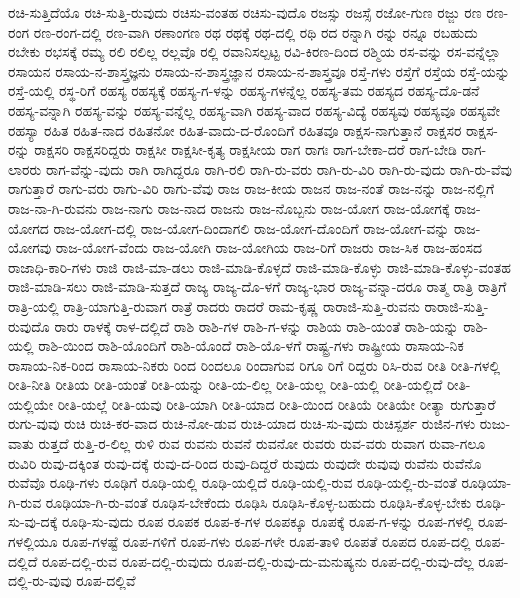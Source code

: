 {ರಚಿ-ಸುತ್ತಿದೆಯೊ
ರಚಿ-ಸುತ್ತಿ-ರುವುದು
ರಚಿಸು-ವಂತಹ
ರಚಿಸು-ವುದೊ
ರಜಸ್ಸು
ರಜಸ್ಸೆ
ರಜೋ-ಗುಣ
ರಜ್ಜು
ರಣ
ರಣ-ರಂಗ
ರಣ-ರಂಗ-ದಲ್ಲಿ
ರಣ-ವಾಗಿ
ರಣಾಂಗಣ
ರಥ
ರಥಕ್ಕೆ
ರಥ-ದಲ್ಲಿ
ರಥಿ
ರದ
ರನ್ನಾಗಿ
ರನ್ನು
ರನ್ನೂ
ರಬಹುದು
ರಬೇಕು
ರಭಸಕ್ಕೆ
ರಮ್ಯ
ರಲಿ
ರಲಿಲ್ಲ
ರಲ್ಲವೊ
ರಲ್ಲಿ
ರವಾನಿಸಲ್ಪಟ್ಟ
ರವಿ-ಕಿರಣ-ದಿಂದ
ರಶ್ಮಿಯ
ರಸ-ವನ್ನು
ರಸ-ವನ್ನೆಲ್ಲಾ
ರಸಾಯನ
ರಸಾಯ-ನ-ಶಾಸ್ತ್ರಜ್ಞನು
ರಸಾಯ-ನ-ಶಾಸ್ತ್ರಜ್ಞಾನ
ರಸಾಯ-ನ-ಶಾಸ್ತ್ರವೂ
ರಸ್ತೆ-ಗಳು
ರಸ್ತೆಗೆ
ರಸ್ತೆಯ
ರಸ್ತೆ-ಯನ್ನು
ರಸ್ತೆ-ಯಲ್ಲಿ
ರಸ್ಥ-ರಿಗೆ
ರಹಸ್ಯ
ರಹಸ್ಯಕ್ಕೆ
ರಹಸ್ಯ-ಗ-ಳನ್ನು
ರಹಸ್ಯ-ಗಳನ್ನೆಲ್ಲ
ರಹಸ್ಯ-ತಮ
ರಹಸ್ಯದ
ರಹಸ್ಯ-ದೊ-ಡನೆ
ರಹಸ್ಯ-ವನ್ನಾಗಿ
ರಹಸ್ಯ-ವನ್ನು
ರಹಸ್ಯ-ವನ್ನೆಲ್ಲ
ರಹಸ್ಯ-ವಾಗಿ
ರಹಸ್ಯ-ವಾದ
ರಹಸ್ಯ-ವಿದ್ಯೆ
ರಹಸ್ಯವು
ರಹಸ್ಯವೂ
ರಹಸ್ಯವೇ
ರಹಸ್ಯಾ
ರಹಿತ
ರಹಿತ-ನಾದ
ರಹಿತನೋ
ರಹಿತ-ವಾದು-ದ-ರೊಂದಿಗೆ
ರಹಿತವೂ
ರಾಕ್ಷಸ-ನಾಗುತ್ತಾನೆ
ರಾಕ್ಷಸರ
ರಾಕ್ಷಸ-ರನ್ನು
ರಾಕ್ಷಸರಿ
ರಾಕ್ಷಸರಿದ್ದರು
ರಾಕ್ಷಸೀ
ರಾಕ್ಷಸೀ-ಕೃತ್ಯ
ರಾಕ್ಷಸೀಯ
ರಾಗ
ರಾಗಃ
ರಾಗ-ಬೇಕಾ-ದರೆ
ರಾಗ-ಬೇಡಿ
ರಾಗ-ಲಾರರು
ರಾಗ-ವೆನ್ನು-ವುದು
ರಾಗಿ
ರಾಗಿದ್ದರೂ
ರಾಗಿ-ರಲಿ
ರಾಗಿ-ರು-ವರು
ರಾಗಿ-ರು-ವಿರಿ
ರಾಗಿ-ರು-ವುದು
ರಾಗಿ-ರು-ವೆವು
ರಾಗುತ್ತಾರೆ
ರಾಗು-ವರು
ರಾಗು-ವಿರಿ
ರಾಗು-ವೆವು
ರಾಜ
ರಾಜ-ಕೀಯ
ರಾಜನ
ರಾಜ-ನಂತೆ
ರಾಜ-ನನ್ನು
ರಾಜ-ನಲ್ಲಿಗೆ
ರಾಜ-ನಾ-ಗಿ-ರುವನು
ರಾಜ-ನಾಗು
ರಾಜ-ನಾದ
ರಾಜನು
ರಾಜ-ನೊಬ್ಬನು
ರಾಜ-ಯೋಗ
ರಾಜ-ಯೋಗಕ್ಕೆ
ರಾಜ-ಯೋಗದ
ರಾಜ-ಯೋಗ-ದಲ್ಲಿ
ರಾಜ-ಯೋಗ-ದಿಂದಾಗಲಿ
ರಾಜ-ಯೋಗ-ದೊಂದಿಗೆ
ರಾಜ-ಯೋಗ-ವನ್ನು
ರಾಜ-ಯೋಗವು
ರಾಜ-ಯೋಗ-ವೆಂದು
ರಾಜ-ಯೋಗಿ
ರಾಜ-ಯೋಗಿಯ
ರಾಜ-ರಿಗೆ
ರಾಜರು
ರಾಜ-ಸಿಕ
ರಾಜ-ಹಂಸದ
ರಾಜಾಧಿ-ಕಾರಿ-ಗಳು
ರಾಜಿ
ರಾಜಿ-ಮಾ-ಡಲು
ರಾಜಿ-ಮಾಡಿ-ಕೊಳ್ಳದೆ
ರಾಜಿ-ಮಾಡಿ-ಕೊಳ್ಳು
ರಾಜಿ-ಮಾಡಿ-ಕೊಳ್ಳು-ವಂತಹ
ರಾಜಿ-ಮಾಡಿ-ಸಲು
ರಾಜಿ-ಮಾಡಿ-ಸುತ್ತದೆ
ರಾಜ್ಯ
ರಾಜ್ಯ-ದೊ-ಳಗೆ
ರಾಜ್ಯ-ಭಾರ
ರಾಜ್ಯ-ವನ್ನಾ-ದರೂ
ರಾತ್ಮ
ರಾತ್ರಿ
ರಾತ್ರಿಗೆ
ರಾತ್ರಿ-ಯಲ್ಲಿ
ರಾತ್ರಿ-ಯಾಗುತ್ತಿ-ರುವಾಗ
ರಾತ್ರೆ
ರಾದರು
ರಾದರೆ
ರಾಮ-ಕೃಷ್ಣ
ರಾರಾಜಿ-ಸುತ್ತಿ-ರುವನು
ರಾರಾಜಿ-ಸುತ್ತಿ-ರುವುದೊ
ರಾರು
ರಾಳಕ್ಕೆ
ರಾಳ-ದಲ್ಲಿದೆ
ರಾಶಿ
ರಾಶಿ-ಗಳ
ರಾಶಿ-ಗ-ಳನ್ನು
ರಾಶಿಯ
ರಾಶಿ-ಯಂತೆ
ರಾಶಿ-ಯನ್ನು
ರಾಶಿ-ಯಲ್ಲಿ
ರಾಶಿ-ಯಿಂದ
ರಾಶಿ-ಯೊಂದಿಗೆ
ರಾಶಿ-ಯೊಂದೆ
ರಾಶಿ-ಯೊ-ಳಗೆ
ರಾಷ್ಟ್ರ-ಗಳು
ರಾಷ್ಟ್ರೀಯ
ರಾಸಾಯ-ನಿಕ
ರಾಸಾಯ-ನಿಕ-ರಿಂದ
ರಾಸಾಯ-ನಿಕರು
ರಿಂದ
ರಿಂದಲೂ
ರಿಂದಾಗುವ
ರಿಗೂ
ರಿಗೆ
ರಿದ್ದರು
ರಿಸಿ-ರುವ
ರೀತಿ
ರೀತಿ-ಗಳಲ್ಲಿ
ರೀತಿ-ನೀತಿ
ರೀತಿಯ
ರೀತಿ-ಯಂತೆ
ರೀತಿ-ಯನ್ನು
ರೀತಿ-ಯ-ಲಿಲ್ಲ
ರೀತಿ-ಯಲ್ಲ
ರೀತಿ-ಯಲ್ಲಿ
ರೀತಿ-ಯಲ್ಲಿದೆ
ರೀತಿ-ಯಲ್ಲಿಯೇ
ರೀತಿ-ಯಲ್ಲೆ
ರೀತಿ-ಯವು
ರೀತಿ-ಯಾಗಿ
ರೀತಿ-ಯಾದ
ರೀತಿ-ಯಿಂದ
ರೀತಿಯೆ
ರೀತಿಯೇ
ರೀತ್ಯಾ
ರುಗುತ್ತಾರೆ
ರುಗು-ವುವು
ರುಚಿ
ರುಚಿ-ಕರ-ವಾದ
ರುಚಿ-ನೋ-ಡುವ
ರುಚಿ-ಯಾದ
ರುಚಿ-ಸು-ವುದು
ರುಚಿಸ್ಪರ್ಶ
ರುಜಿನ-ಗಳು
ರುಜು-ವಾತು
ರುತ್ತದೆ
ರುತ್ತಿ-ರ-ಲಿಲ್ಲ
ರುಳಿ
ರುವ
ರುವನು
ರುವನೆ
ರುವನೋ
ರುವರು
ರುವ-ವರು
ರುವಾಗ
ರುವಾ-ಗಲೂ
ರುವಿರಿ
ರುವು-ದಕ್ಕಿಂತ
ರುವು-ದಕ್ಕೆ
ರುವು-ದ-ರಿಂದ
ರುವು-ದಿದ್ದರೆ
ರುವುದು
ರುವುದೇ
ರುವುವು
ರುವೆನು
ರುವೆನೊ
ರುವೆವೊ
ರೂಢಿ-ಗಳು
ರೂಢಿಗೆ
ರೂಢಿ-ಯಲ್ಲಿ
ರೂಢಿ-ಯಲ್ಲಿದೆ
ರೂಢಿ-ಯಲ್ಲಿ-ರುವ
ರೂಢಿ-ಯಲ್ಲಿ-ರು-ವಂತೆ
ರೂಢಿಯಾ-ಗಿ-ರುವ
ರೂಢಿಯಾ-ಗಿ-ರು-ವಂತೆ
ರೂಢಿಸ-ಬೇಕೆಂದು
ರೂಢಿಸಿ
ರೂಢಿಸಿ-ಕೊಳ್ಳ-ಬಹುದು
ರೂಢಿಸಿ-ಕೊಳ್ಳ-ಬೇಕು
ರೂಢಿ-ಸು-ವು-ದಕ್ಕೆ
ರೂಢಿ-ಸು-ವುದು
ರೂಪ
ರೂಪಕ
ರೂಪ-ಕ-ಗಳ
ರೂಪಕ್ಕೂ
ರೂಪಕ್ಕೆ
ರೂಪ-ಗ-ಳನ್ನು
ರೂಪ-ಗಳಲ್ಲಿ
ರೂಪ-ಗಳಲ್ಲಿಯೂ
ರೂಪ-ಗಳಷ್ಟೆ
ರೂಪ-ಗಳಿಗೆ
ರೂಪ-ಗಳು
ರೂಪ-ಗಳೇ
ರೂಪ-ತಾಳಿ
ರೂಪತೆ
ರೂಪದ
ರೂಪ-ದಲ್ಲಿ
ರೂಪ-ದಲ್ಲಿದೆ
ರೂಪ-ದಲ್ಲಿ-ರುವ
ರೂಪ-ದಲ್ಲಿ-ರುವುದು
ರೂಪ-ದಲ್ಲಿ-ರುವು-ದು-ಮನುಷ್ಯನು
ರೂಪ-ದಲ್ಲಿ-ರುವು-ದೆಲ್ಲ
ರೂಪ-ದಲ್ಲಿ-ರು-ವುವು
ರೂಪ-ದಲ್ಲಿವೆ
}
